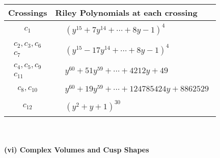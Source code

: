 \documentclass[1p]{elsarticle_modified}
\theoremstyle{definition}
\begin{document}
\begin{tabular}{m{50pt}|m{274pt}}
Crossings & \hspace{64pt}Riley Polynomials at each crossing \\
\hline $$\begin{aligned}c_{1}\end{aligned}$$&$\begin{aligned}
&(y^{15}+7 y^{14}+\cdots+8 y-1)^{4}
\end{aligned}$\\
\hline $$\begin{aligned}c_{2},c_{3},c_{6}\\c_{7}\end{aligned}$$&$\begin{aligned}
&(y^{15}-17 y^{14}+\cdots+8 y-1)^{4}
\end{aligned}$\\
\hline $$\begin{aligned}c_{4},c_{5},c_{9}\\c_{11}\end{aligned}$$&$\begin{aligned}
&y^{60}+51 y^{59}+\cdots+4212 y+49
\end{aligned}$\\
\hline $$\begin{aligned}c_{8},c_{10}\end{aligned}$$&$\begin{aligned}
&y^{60}+19 y^{59}+\cdots+124785424 y+8862529
\end{aligned}$\\
\hline $$\begin{aligned}c_{12}\end{aligned}$$&$\begin{aligned}
&(y^2+y+1)^{30}
\end{aligned}$\\
\hline
\end{tabular}\\~\\
\newpage\flushleft \textbf{(vi) Complex Volumes and Cusp Shapes}
\end{document}
